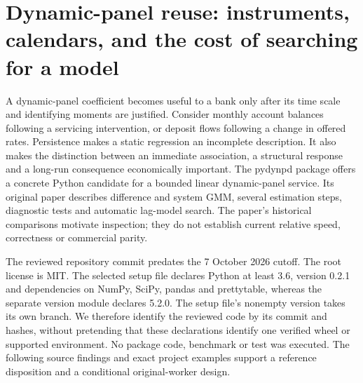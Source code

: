 \section{Dynamic-panel reuse: instruments, calendars, and the cost of searching for a model}
\label{sec:exec24-pydynpd}

A dynamic-panel coefficient becomes useful to a bank only after its time scale and identifying moments are justified.
Consider monthly account balances following a servicing intervention, or deposit flows
following a change in offered rates. Persistence makes a static regression an incomplete
description. It also makes the distinction between an immediate association, a structural
response and a long-run consequence economically important. The pydynpd package offers
a concrete Python candidate for a bounded linear dynamic-panel service. Its original paper
describes difference and system GMM, several estimation steps, diagnostic tests and automatic
lag-model search. The paper's historical comparisons motivate inspection; they do not establish
current relative speed, correctness or commercial parity.\citep{exec24_pydynpd_paper}

The reviewed repository commit predates the 7 October 2026 cutoff. The root license is MIT.
The selected setup file declares Python at least 3.6, version 0.2.1 and dependencies on NumPy,
SciPy, pandas and prettytable, whereas the separate version module declares 5.2.0. The setup
file's nonempty version takes its own branch. We therefore identify the reviewed code by its
commit and hashes, without pretending that these declarations identify one verified wheel or
supported environment. No package code, benchmark or test was executed. The following
source findings and exact project examples support a reference disposition and a conditional
original-worker design.\citep{exec24_pydynpd_source}

